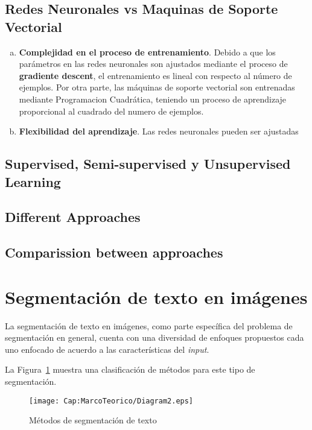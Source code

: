 {  \subsection{Redes Neuronales vs Maquinas de Soporte Vectorial}
  \begin{enumerate}[(a)]
    \item \textbf{Complejidad en el proceso de entrenamiento}. Debido a que
    los parámetros en las redes neuronales son ajustados mediante el proceso 
    de \textbf{gradiente descent}, el entrenamiento es lineal con respecto al
    número de ejemplos. Por otra parte, las máquinas de soporte vectorial son 
    entrenadas mediante Programacion Cuadrática, teniendo un proceso de 
    aprendizaje proporcional al cuadrado del numero de ejemplos.
    \item \textbf{Flexibilidad del aprendizaje}. Las redes neuronales pueden 
    ser ajustadas
  \end{enumerate}
    \subsection{Supervised, Semi-supervised y Unsupervised Learning}
    \subsection{Different Approaches}
    \subsection{Comparission between approaches}
}

\section{Segmentación de texto en imágenes}
\label{sec:segmentacion-texto-imagenes}
La segmentación de texto en imágenes, como parte específica del problema de
segmentación en general, cuenta con una diversidad de enfoques propuestos cada
uno enfocado de acuerdo a las características del \textit{input}.

La Figura~\ref{cap-marcoteorico:segmentaciontexto} muestra una clasificación
de métodos para este tipo de segmentación.

\begin{figure}[h!]
	\centering
  \texttt{[image: Cap:MarcoTeorico/Diagram2.eps]}
  \caption{Métodos de segmentación de texto}
  \label{cap-marcoteorico:segmentaciontexto}
\end{figure}

